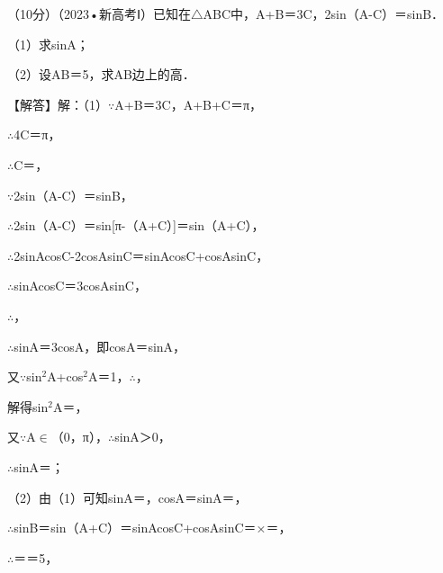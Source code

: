 \begin{question}
（10分）（2023•新高考Ⅰ）已知在$\triangle$ABC中，A+B＝3C，2sin（A-C）＝sinB．\par
（1）求sinA；\par
（2）设AB＝5，求AB边上的高．\par
\begin{solution}
【解答】解：（1）$\because$A+B＝3C，A+B+C＝π，\par
$\therefore$4C＝π，\par
$\therefore$C＝\allowbreak{}，\par
$\because$2sin（A-C）＝sinB，\par
$\therefore$2sin（A-C）＝sin[π-（A+C）]＝sin（A+C），\par
$\therefore$2sinAcosC-2cosAsinC＝sinAcosC+cosAsinC，\par
$\therefore$sinAcosC＝3cosAsinC，\par
$\therefore$\allowbreak{}，\par
$\therefore$sinA＝3cosA，即cosA＝\allowbreak{}sinA，\par
又$\because$sin$^{2}$A+cos$^{2}$A＝1，$\therefore$\allowbreak{}，\par
解得sin$^{2}$A＝\allowbreak{}，\par
又$\because$A$\in$（0，π），$\therefore$sinA＞0，\par
$\therefore$sinA＝\allowbreak{}；\par
（2）由（1）可知sinA＝\allowbreak{}，cosA＝\allowbreak{}sinA＝\allowbreak{}，\par
$\therefore$sinB＝sin（A+C）＝sinAcosC+cosAsinC＝\allowbreak{}×\allowbreak{}\allowbreak{}＝\allowbreak{}，\par
$\therefore$\allowbreak{}＝\allowbreak{}＝5\allowbreak{}，\par

\end{solution}
\end{question}
